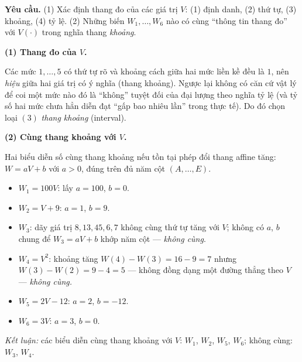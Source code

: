 \textbf{Yêu cầu.} (1) Xác định thang đo của các giá trị $V$: (1) định danh, (2) thứ tự, (3) khoảng, (4) tỷ lệ. (2) Những biến $W_1,\ldots,W_6$ nào có cùng ``thông tin thang đo'' với $V(\cdot)$ trong nghĩa thang \emph{khoảng}.

\medskip
\textbf{(1) Thang đo của $V$.}

Các mức $1,\ldots,5$ có thứ tự rõ và khoảng cách giữa hai mức liền kề đều là $1$, nên \emph{hiệu} giữa hai giá trị có ý nghĩa (thang khoảng). Ngược lại không có căn cứ vật lý để coi một mức nào đó là ``không'' tuyệt đối của đại lượng theo nghĩa tỷ lệ (và tỷ số hai mức chưa hẳn diễn đạt ``gấp bao nhiêu lần'' trong thực tế). Do đó chọn loại $(3)$ \emph{thang khoảng} (interval).

\textbf{(2) Cùng thang khoảng với $V$.}

Hai biểu diễn số cùng thang khoảng nếu tồn tại phép đổi thang affine tăng: $W=aV+b$ với $a>0$, đúng trên đủ năm cột $(A,\ldots,E)$.

\begin{itemize}
  \item $W_1=100V$: lấy $a=100$, $b=0$.
  \item $W_2=V+9$: $a=1$, $b=9$.
  \item $W_3$: dãy giá trị $8,13,45,6,7$ không cùng thứ tự tăng với $V$; không có $a$, $b$ chung để $W_3=aV+b$ khớp năm cột --- \emph{không cùng}.
  \item $W_4=V^2$: khoảng tăng $W(4)-W(3)=16-9=7$ nhưng $W(3)-W(2)=9-4=5$ --- không đồng dạng một đường thẳng theo $V$ --- \emph{không cùng.}
  \item $W_5=2V-12$: $a=2$, $b=-12$.
  \item $W_6=3V$: $a=3$, $b=0$.
\end{itemize}

\textit{Kết luận:} các biểu diễn cùng thang khoảng với $V$: $W_1$, $W_2$, $W_5$, $W_6$; không cùng: $W_3$, $W_4$.
